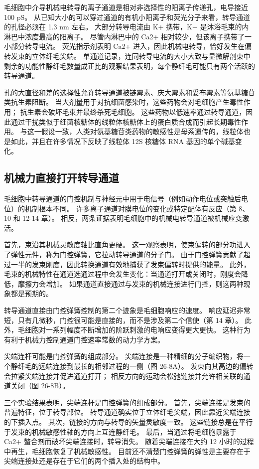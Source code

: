 毛细胞中介导机械电转导的离子通道是相对非选择性的阳离子传递孔，电导接近 100 pS。 从已知大小的可以穿过通道的有机小阳离子和荧光分子来看，转导通道的孔径必须在 1.3 nm 左右。 大部分转导电流由 K+ 携带，K+ 是沐浴毛束的内淋巴中浓度最高的阳离子。 尽管内淋巴中的 Ca2+ 相对较少，但该离子携带了一小部分转导电流。 荧光指示剂表明 Ca2+ 进入，因此机械电转导，恰好发生在偏转发束的立体纤毛尖端。 单通道记录，连同转导电流的大小大致与显微解剖束中剩余的功能性静纤毛数量成正比的观察结果表明，每个静纤毛可能只有两个活跃的转导通道。

孔的大直径和差的选择性允许转导通道被链霉素、庆大霉素和妥布霉素等氨基糖苷类抗生素阻断。 当大剂量用于对抗细菌感染时，这些药物会对毛细胞产生毒性作用； 抗生素会破坏毛束并最终杀死毛细胞。 这些药物以低速率通过转导通道，因此通过干扰类似于细菌核糖体的线粒体核糖体上的蛋白质合成而引起长期毒性作用。 与这一假设一致，人类对氨基糖苷类药物的敏感性是母系遗传的，线粒体也是如此，并且在许多情况下反映了线粒体 12S 核糖体 RNA 基因的单个碱基变化。


\subsection{机械力直接打开转导通道}
毛细胞中转导通道的门控机制与神经元中用于电信号（例如动作电位或突触后电位）的机制根本不同。 许多离子通道对膜电位的变化或特定配体有反应（第 8、10 和 12-14 章）。 相反，两条证据表明毛细胞中的机械电转导通道被机械应变激活。

首先，束沿其机械灵敏度轴比直角更硬。 这一观察表明，使束偏转的部分功进入了弹性元件，称为门控弹簧，它拉动转导通道的分子门。 由于门控弹簧贡献了超过一半的发束刚度，因此转换通道有效地捕获了发束偏转时提供的能量。 此外，毛束的机械特性在通道选通过程中会发生变化：当通道打开或关闭时，刚度会降低，摩擦力会增加。 如果通道直接通过与发束的机械连接进行门控，则这两种现象都是预期的。

转导通道直接由门控弹簧控制的第二个迹象是毛细胞响应的速度。 响应延迟非常短，只有几微秒，门控很可能是直接的，而不是涉及第二个信使（第 14 章）。 此外，毛细胞对一系列幅度不断增加的阶跃刺激的电响应变得更大更快。 这种行为有利于机械力控制通道门控速率常数的动力学方案。

尖端连杆可能是门控弹簧的组成部分。 尖端连接是一种精细的分子编织物，将一个静纤毛的远端连接到最长的相邻过程的一侧（图 26-8A）。 发束向其高边的偏转会拉紧尖端连接并促进通道打开； 相反方向的运动会松弛链接并允许相关联的通道关闭（图 26-8B）。

三个实验结果表明，尖端连杆是门控弹簧的组成部分。 首先，尖端连接是发束的普遍特征，位于转导部位。 转导通道确实位于立体纤毛尖端，因此靠近尖端连接的下插入点。 其次，链接的方向与转导的矢量灵敏度一致。 这些链接总是在平行于发束的机械敏感性轴的方向上互连静纤毛。 最后，当通过将毛细胞暴露于 Ca2+ 螯合剂而破坏尖端连接时，转导消失。 随着尖端连接在大约 12 小时的过程中再生，毛细胞恢复了机械敏感性。 目前还不清楚门控弹簧的弹性是主要存在于尖端连接处还是存在于它们的两个插入处的结构中。

